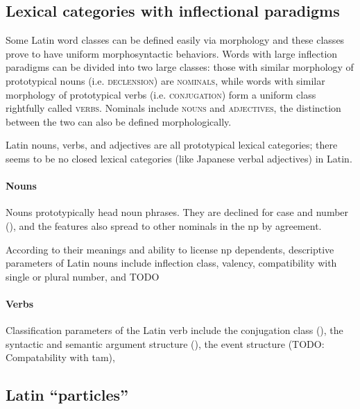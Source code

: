 \documentclass[a4paper, oneside, 12pt]{report}
\newcommand*{\category}[1]{\textsc{#1}}
\begin{document}
\subsection{Lexical categories with inflectional paradigms}

Some Latin word classes can be defined easily via morphology
and these classes prove to have uniform morphosyntactic behaviors.
Words with large inflection paradigms can be divided into two large classes:
those with similar morphology of prototypical nouns (i.e. \category{declension}) are \category{nominals},
while words with similar morphology of prototypical verbs (i.e. \category{conjugation})
form a uniform class rightfully called \category{verbs}.
Nominals include \category{nouns} and \category{adjectives},
the distinction between the two can also be defined morphologically.

Latin nouns, verbs, and adjectives are all prototypical lexical categories;
there seems to be no closed lexical categories (like Japanese verbal adjectives) in Latin.

\paragraph*{Nouns}

Nouns prototypically head noun phrases.
They are declined for case and number (),
and the features also spread to other nominals in the \acs{np} by agreement.

According to their meanings and ability to license \acs{np} dependents, 
descriptive parameters of Latin nouns include 
inflection class, valency, compatibility with single or plural number, and TODO

\paragraph*{Verbs}

Classification parameters of the Latin verb include 
the conjugation class (),
the syntactic and semantic argument structure
(), 
the event structure (TODO: Compatability with \acs{tam}),

\subsection{Latin ``particles''}
\end{document}
